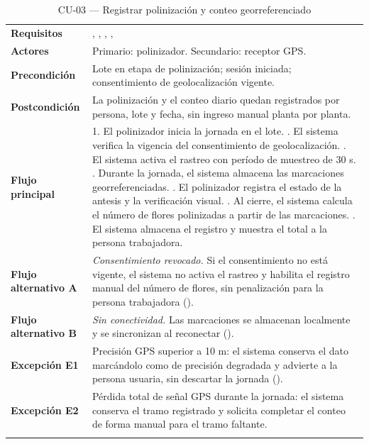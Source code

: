 \begin{longtable}{|L{3.4cm}|L{12.0cm}|}
\hline
{}\\
\hline
\textbf{Requisitos} & , , , ,  \\ \hline
\textbf{Actores} & Primario: polinizador. Secundario: receptor GPS. \\ \hline
\textbf{Precondición} & Lote en etapa de polinización; sesión iniciada; consentimiento de geolocalización vigente. \\ \hline
\textbf{Postcondición} & La polinización y el conteo diario quedan registrados por persona, lote y fecha, sin ingreso manual planta por planta. \\ \hline
\textbf{Flujo principal} & 1. El polinizador inicia la jornada en el lote. . El sistema verifica la vigencia del consentimiento de geolocalización. . El sistema activa el rastreo con período de muestreo de 30 s. . Durante la jornada, el sistema almacena las marcaciones georreferenciadas. . El polinizador registra el estado de la antesis y la verificación visual. . Al cierre, el sistema calcula el número de flores polinizadas a partir de las marcaciones. . El sistema almacena el registro y muestra el total a la persona trabajadora. \\ \hline
\textbf{Flujo alternativo A} & \emph{Consentimiento revocado.} Si el consentimiento no está vigente, el sistema no activa el rastreo y habilita el registro manual del número de flores, sin penalización para la persona trabajadora (). \\ \hline
\textbf{Flujo alternativo B} & \emph{Sin conectividad.} Las marcaciones se almacenan localmente y se sincronizan al reconectar (). \\ \hline
\textbf{Excepción E1} & Precisión GPS superior a 10 m: el sistema conserva el dato marcándolo como de precisión degradada y advierte a la persona usuaria, sin descartar la jornada (). \\ \hline
\textbf{Excepción E2} & Pérdida total de señal GPS durante la jornada: el sistema conserva el tramo registrado y solicita completar el conteo de forma manual para el tramo faltante. \\ \hline
\caption{CU-03 --- Registrar polinización y conteo georreferenciado}
\end{longtable}

